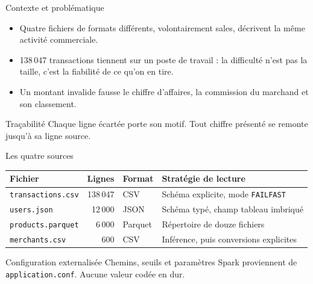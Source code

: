 \documentclass[aspectratio=169,11pt]{beamer}
\begin{document}
\begin{frame}{Contexte et problématique}
  \begin{itemize}\itemsep3mm
    \item Quatre fichiers de formats différents, volontairement sales, décrivent
          la même activité commerciale.
    \item 138\,047 transactions tiennent sur un poste de travail : la difficulté
          n'est pas la taille, c'est la fiabilité de ce qu'on en tire.
    \item Un montant invalide fausse le chiffre d'affaires, la commission du
          marchand et son classement.
  \end{itemize}

  \vspace{4mm}
  \begin{block}{Traçabilité}
    Chaque ligne écartée porte son motif. Tout chiffre présenté se remonte
    jusqu'à sa ligne source.
  \end{block}

\end{frame}

\begin{frame}{Les quatre sources}
  \vspace{1mm}
  \begin{center}
  \small
  \begin{tabular}{@{}l r l p{5.6cm}@{}}
    \toprule
    \textbf{Fichier} & \textbf{Lignes} & \textbf{Format} & \textbf{Stratégie de lecture} \\
    \midrule
    \texttt{transactions.csv} & 138\,047 & CSV     & Schéma explicite, mode \texttt{FAILFAST} \\
    \texttt{users.json}       &  12\,000 & JSON    & Schéma typé, champ tableau imbriqué \\
    \texttt{products.parquet} &   6\,000 & Parquet & Répertoire de douze fichiers \\
    \texttt{merchants.csv}    &     600  & CSV     & Inférence, puis conversions explicites \\
    \bottomrule
  \end{tabular}
  \end{center}

  \vspace{5mm}
  \begin{block}{Configuration externalisée}
    Chemins, seuils et paramètres Spark proviennent de
    \texttt{application.conf}. Aucune valeur codée en dur.
  \end{block}

\end{frame}
\end{document}
